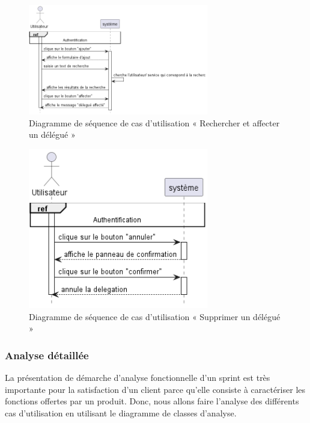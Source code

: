 \begin{figure}[H]
  \centering
  \includegraphics[width=0.7\textwidth]{out/diagrams/sprint6/search_affect_delegation/search_affect_delegation}
  \caption{Diagramme de séquence de cas d'utilisation « Rechercher et affecter un délégué »}
  \label{fig:sequence_search_affect_delegation}
\end{figure}

\begin{figure}[H]
  \centering
  \includegraphics[width=0.7\textwidth]{out/diagrams/sprint6/annulation_delegation/annulation_delegation}
  \caption{Diagramme de séquence de cas d'utilisation « Supprimer un délégué »}
  \label{fig:sequence_annulation_delegation}
\end{figure}




\subsubsection{Analyse détaillée}
La présentation de démarche d'analyse fonctionnelle d'un sprint est très importante pour la satisfaction d'un client parce qu'elle consiste à caractériser les fonctions offertes par un produit.
Donc, nous allons faire l'analyse des différents cas d'utilisation en utilisant le diagramme de classes d'analyse.


